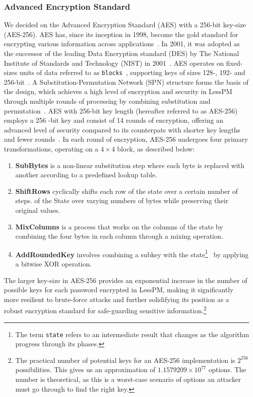 \subsubsection{Advanced Encryption Standard}
We decided on the Advanced Encryption Standard (AES) with a 256-bit key-size
(AES-256).
AES has, since its inception in 1998, become the gold standard for encrypting
various information across
applications~\cite{schneier2015applied,rijndael_book}.
In 2001, it was adopted as the successor of the leading Data Encryption
standard (DES) by The National Institute of Standards and Technology (NIST)
in 2001~\cite{nist_aes_winner}.
AES operates on fixed-sizes units of data referred to as
\texttt{blocks}~\cite{nistfips197blocks}, supporting keys of sizes 128-, 192-
and 256-bit~\cite{nistfips197intro}.
A Substitution-Permutation Network (SPN) structure forms the basis of the
design, which achieves a high level of encryption and security in LessPM
through multiple rounds of processing by combining substitution and
permutation~\cite{nistfips197specification}.
AES with 256-bit key length (hereafter referred to as AES-256) employs a 256
-bit key and consist of 14 rounds of encryption, offering an advanced level
of security compared to its counterpats with shorter key lengths and fewer
rounds~\cite{nistfips197256}.
In each round of encryption, AES-256 undergoes four primary transformations,
operating on a $4\times4$ block, as described below:

  \begin{enumerate}
    \item \textbf{SubBytes} is a non-linear substitution step where each byte is
    replaced with another according to a predefined lookup table.
    \item \textbf{ShiftRows} cyclically shifts each row of the state over a
    certain number of steps.
    of the State over varying numbers of bytes while preserving their original
    values.
    \item \textbf{MixColumns} is a process that works on the columns of the
    state by combining the four bytes in each column through a mixing operation.
    \item \textbf{AddRoundedKey} involves combining a subkey with the state\footnote{
      The term \texttt{state} refers to an intermediate result that changes as
      the algorithm progress through its phases.
    }
    ~by applying a bitwise XOR operation.
  \end{enumerate}

The larger key-size in AES-256 provides an exponential increase in the number
of possible keys for each password encrypted in LessPM, making it
significantly more resilient to brute-force attacks and further solidifying
its position as a robust encryption standard for safe-guarding sensitive
information.\footnote{
  The practical number of potential keys for an AES-256 implementation is
  $2^{256}$ possibilities. This gives us an approximation of
  $1.1579209 \times 10^{77}$ options.
  The number is theoretical, as this is a worst-case scenario of options an
  attacker must go through to find the right key.
}

